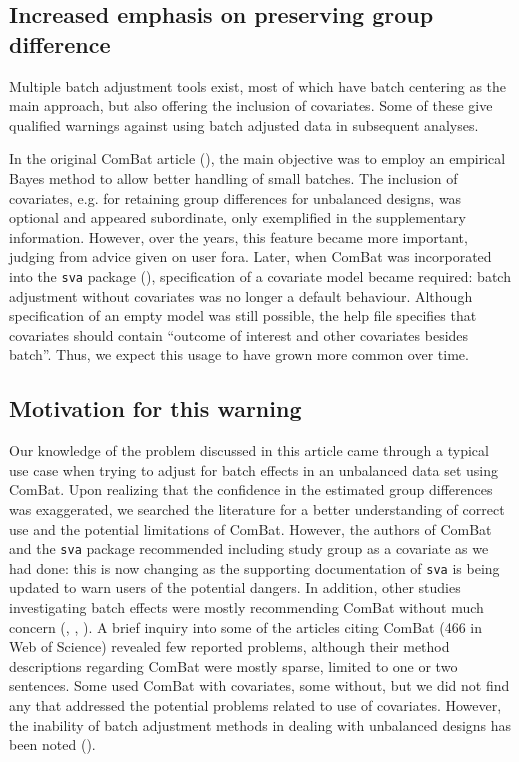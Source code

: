 \documentclass{bio}
\begin{document}
\subsection{Increased emphasis on preserving group difference}

Multiple batch adjustment tools exist, most of which have batch centering as the main approach, but also offering the inclusion of covariates. Some of these give qualified warnings against using batch adjusted data in subsequent analyses.

In the original ComBat article (\citealp{Johnson2007}), the main objective was to employ an empirical Bayes method to allow better handling of small batches. The inclusion of covariates, e.g. for retaining group differences for unbalanced designs, was optional and appeared subordinate, only exemplified in the supplementary information. However, over the years, this feature became more important, judging from advice given on user fora.
Later, when ComBat was incorporated into the \texttt{sva} package (\citealp{Leek2012}), specification of a covariate model became required: batch adjustment without covariates was no longer a default behaviour. Although specification of an empty model was still possible, the help file specifies that covariates should contain ``outcome of interest and other covariates besides batch''. Thus, we expect this usage to have grown more common over time.

\subsection{Motivation for this warning}

Our knowledge of the problem discussed in this article came through a typical use case when trying to adjust for batch effects in an unbalanced data set using ComBat. Upon realizing that the confidence in the estimated group differences was exaggerated, we searched the literature for a better understanding of correct use and the potential limitations of ComBat. However, the authors of ComBat and the \texttt{sva} package recommended including study group as a covariate as we had done: this is now changing as the supporting documentation of \texttt{sva} is being updated to warn users of the potential dangers. In addition, other studies investigating batch effects were mostly recommending ComBat without much concern (\citealp{Kupfer2012}, \citealp{Kitchen2011}, \citealp{Chen2011}). A brief inquiry into some of the articles citing ComBat (466 in Web of Science) revealed few reported problems, although their method descriptions regarding ComBat were mostly sparse, limited to one or two sentences. Some used ComBat with covariates, some without, but we did not find any that addressed the potential problems related to use of covariates. However, the inability of batch adjustment methods in dealing with unbalanced designs has been noted (\citealp{Buhule2014}).
\end{document}
